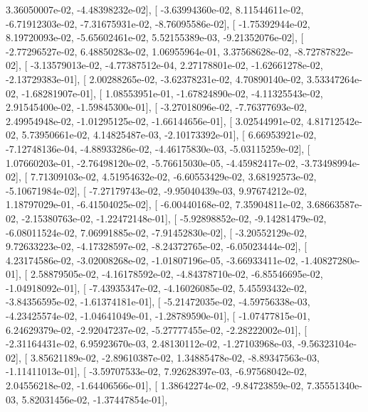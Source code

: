 \documentclass{article}
\begin{document}
          3.36050007e-02,  -4.48398232e-02],
       [ -3.63994360e-02,   8.11544611e-02,  -6.71912303e-02,
         -7.31675931e-02,  -8.76095586e-02],
       [ -1.75392944e-02,   8.19720093e-02,  -5.65602461e-02,
          5.52155389e-03,  -9.21352076e-02],
       [ -2.77296527e-02,   6.48850283e-02,   1.06955964e-01,
          3.37568628e-02,  -8.72787822e-02],
       [ -3.13579013e-02,  -4.77387512e-04,   2.27178801e-02,
         -1.62661278e-02,  -2.13729383e-01],
       [  2.00288265e-02,  -3.62378231e-02,   4.70890140e-02,
          3.53347264e-02,  -1.68281907e-01],
       [  1.08553951e-01,  -1.67824890e-02,  -4.11325543e-02,
          2.91545400e-02,  -1.59845300e-01],
       [ -3.27018096e-02,  -7.76377693e-02,   2.49954948e-02,
         -1.01295125e-02,  -1.66144656e-01],
       [  3.02544991e-02,   4.81712542e-02,   5.73950661e-02,
          4.14825487e-03,  -2.10173392e-01],
       [  6.66953921e-02,  -7.12748136e-04,  -4.88933286e-02,
         -4.46175830e-03,  -5.03115259e-02],
       [  1.07660203e-01,  -2.76498120e-02,  -5.76615030e-05,
         -4.45982417e-02,  -3.73498994e-02],
       [  7.71309103e-02,   4.51954632e-02,  -6.60553429e-02,
          3.68192573e-02,  -5.10671984e-02],
       [ -7.27179743e-02,  -9.95040439e-03,   9.97674212e-02,
          1.18797029e-01,  -6.41504025e-02],
       [ -6.00440168e-02,   7.35904811e-02,   3.68663587e-02,
         -2.15380763e-02,  -1.22472148e-01],
       [ -5.92898852e-02,  -9.14281479e-02,  -6.08011524e-02,
          7.06991885e-02,  -7.91452830e-02],
       [ -3.20552129e-02,   9.72633223e-02,  -4.17328597e-02,
         -8.24372765e-02,  -6.05023444e-02],
       [  4.23174586e-02,  -3.02008268e-02,  -1.01807196e-05,
         -3.66933411e-02,  -1.40827280e-01],
       [  2.58879505e-02,  -4.16178592e-02,  -4.84378710e-02,
         -6.85546695e-02,  -1.04918092e-01],
       [ -7.43935347e-02,  -4.16026085e-02,   5.45593432e-02,
         -3.84356595e-02,  -1.61374181e-01],
       [ -5.21472035e-02,  -4.59756338e-03,  -4.23425574e-02,
         -1.04641049e-01,  -1.28789590e-01],
       [ -1.07477815e-01,   6.24629379e-02,  -2.92047237e-02,
         -5.27777455e-02,  -2.28222002e-01],
       [ -2.31164431e-02,   6.95923670e-03,   2.48130112e-02,
         -1.27103968e-03,  -9.56323104e-02],
       [  3.85621189e-02,  -2.89610387e-02,   1.34885478e-02,
         -8.89347563e-03,  -1.11411013e-01],
       [ -3.59707533e-02,   7.92628397e-03,  -6.97568042e-02,
          2.04556218e-02,  -1.64406566e-01],
       [  1.38642274e-02,  -9.84723859e-02,   7.35551340e-03,
          5.82031456e-02,  -1.37447854e-01],
\end{document}
